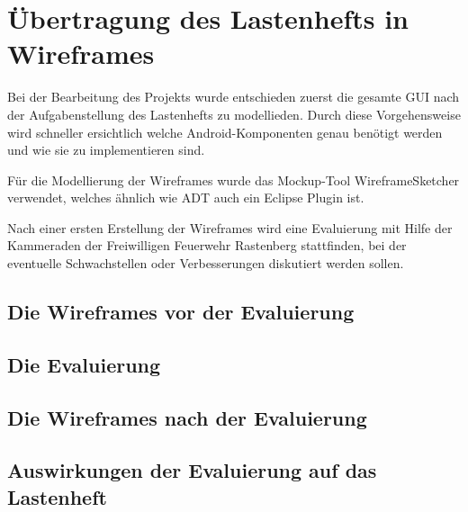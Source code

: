 \section{\"Ubertragung des Lastenhefts in Wireframes}
Bei der Bearbeitung des Projekts wurde entschieden zuerst die gesamte GUI nach der Aufgabenstellung des Lastenhefts zu modellieden. Durch diese Vorgehensweise wird schneller ersichtlich welche Android-Komponenten genau ben\"otigt werden und wie sie zu implementieren sind.

F\"ur die Modellierung der Wireframes wurde das Mockup-Tool WireframeSketcher verwendet, welches \"ahnlich wie \ac{ADT} auch ein Eclipse Plugin ist. 

Nach einer ersten Erstellung der Wireframes wird eine Evaluierung mit Hilfe der Kammeraden der Freiwilligen Feuerwehr Rastenberg stattfinden, bei der eventuelle Schwachstellen oder Verbesserungen diskutiert werden sollen.

\subsection{Die Wireframes vor der Evaluierung}

\subsection{Die Evaluierung}

\subsection{Die Wireframes nach der Evaluierung}

\subsection{Auswirkungen der Evaluierung auf das Lastenheft}